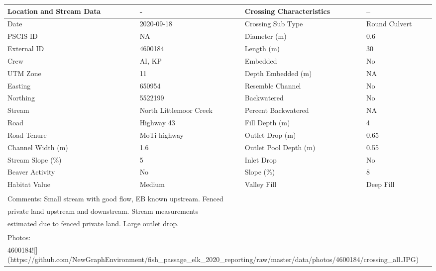\documentclass[
]{book}
\begin{document}
\begin{tabular}{l|l|l|l}
\hline
Location and Stream Data & - & Crossing Characteristics & --\\
\hline
Date & 2020-09-18 & Crossing Sub Type & Round Culvert\\
\hline
PSCIS ID & NA & Diameter (m) & 0.6\\
\hline
External ID & 4600184 & Length (m) & 30\\
\hline
Crew & AI, KP & Embedded & No\\
\hline
UTM Zone & 11 & Depth Embedded (m) & NA\\
\hline
Easting & 650954 & Resemble Channel & No\\
\hline
Northing & 5522199 & Backwatered & No\\
\hline
Stream & North Littlemoor Creek & Percent Backwatered & NA\\
\hline
Road & Highway 43 & Fill Depth (m) & 4\\
\hline
Road Tenure & MoTi highway & Outlet Drop (m) & 0.65\\
\hline
Channel Width (m) & 1.6 & Outlet Pool Depth (m) & 0.55\\
\hline
Stream Slope (\%) & 5 & Inlet Drop & No\\
\hline
Beaver Activity & No & Slope (\%) & 8\\
\hline
Habitat Value & Medium & Valley Fill & Deep Fill\\
\hline
\multicolumn{4}{l}{\textsuperscript{} Comments: Small stream with good flow, EB known upstream. Fenced}\\
\multicolumn{4}{l}{private land upstream and downstream. Stream measurements}\\
\multicolumn{4}{l}{estimated due to fenced private land.  Large outlet drop.}\\
\multicolumn{4}{l}{\textsuperscript{} Photos:}\\
\multicolumn{4}{l}{4600184![](https://github.com/NewGraphEnvironment/fish\_passage\_elk\_2020\_reporting/raw/master/data/photos/4600184/crossing\_all.JPG)}\\
\end{tabular}
\end{document}
